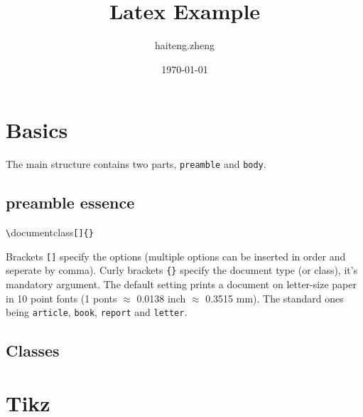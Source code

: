 \documentclass[a4paper, 10pt, letterpaper, portrait, oneside]{article}
\title{Latex Example}
\author{haiteng.zheng}
\date{\today}
\renewcommand\emph[1]{\colorbox{light-gray}{\texttt{#1}}}
\begin{document}
\maketitle
\tableofcontents

\section{Basics}
The main structure contains two parts, \emph{preamble} and \emph{body}.
\subsection{preamble essence}
\begin{tcolorbox}
	\verb"\"documentclass\verb![]{}!
\end{tcolorbox}

Brackets \emph{[]} specify the options (multiple options can be inserted 
in order and seperate by comma).
Curly brackets \emph{\{\}} specify the document type (or class), it's mandatory 
argument. The default setting prints a document on letter-size paper in 10 point 
fonts (1 ponts $\approx$ 0.0138 inch $\approx$ 0.3515 mm).
The standard ones being \emph{article}, \emph{book}, \emph{report} and \emph{letter}.


\subsection{Classes}


\section{Tikz}
\end{document}
